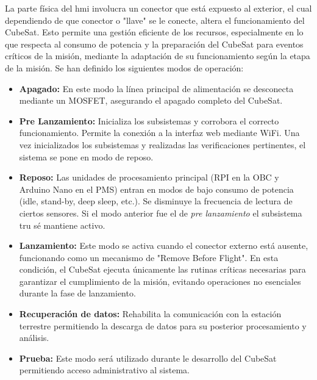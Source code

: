       La parte física del \acrshort{hmi} involucra un conector que está expuesto al exterior, el cual dependiendo de que
      conector o "llave" se le conecte, altera el funcionamiento del CubeSat. Esto permite una gestión eficiente de los
      recursos, especialmente en lo que respecta al consumo de potencia y la preparación del CubeSat para eventos
      críticos de la misión, mediante la adaptación de su funcionamiento según la etapa de la misión. Se han definido
      los siguientes modos de operación:
      \begin{itemize}
        \item \textbf{Apagado:} En este modo la línea principal de alimentación se desconecta mediante un MOSFET,
          asegurando el apagado completo del CubeSat.
        \item \textbf{Pre Lanzamiento:} Inicializa los subsistemas y corrobora el correcto funcionamiento. Permite la
          conexión a la interfaz web mediante WiFi. Una vez inicializados los subsistemas y realizadas las
          verificaciones pertinentes, el sistema se pone en modo de reposo.
        \item \textbf{Reposo:} Las unidades de procesamiento principal (RPI en la OBC y Arduino Nano en el PMS) entran
          en modos de bajo consumo de potencia (idle, stand-by, deep sleep, etc.). Se disminuye la frecuencia de lectura
          de ciertos sensores. Si el modo anterior fue el de \textit{pre lanzamiento} el subsistema \acrshort{tru} sé
          mantiene activo.
        \item \textbf{Lanzamiento:} Este modo se activa cuando el conector externo está ausente, funcionando como un mecanismo de
            "Remove Before Flight". En esta condición, el CubeSat ejecuta únicamente las rutinas críticas necesarias para garantizar
             el cumplimiento de la misión, evitando operaciones no esenciales durante la fase de lanzamiento.
        \item \textbf{Recuperación de datos:} Rehabilita la comunicación con la estación terrestre permitiendo la
          descarga de datos para su posterior procesamiento y análisis.
        \item \textbf{Prueba:} Este modo será utilizado durante le desarrollo del CubeSat permitiendo acceso
          administrativo al sistema.
      \end{itemize}

